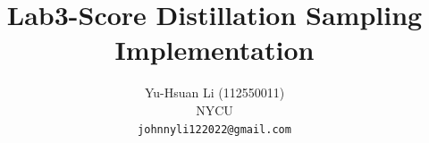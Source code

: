 \documentclass[10pt,twocolumn,letterpaper]{article}
\title{Lab3-Score Distillation Sampling Implementation}
\author{Yu-Hsuan Li (112550011)\\
NYCU\\
{\tt\small johnnyli122022@gmail.com}
}
\begin{document}





{
    \small
    
    
}
\end{document}
